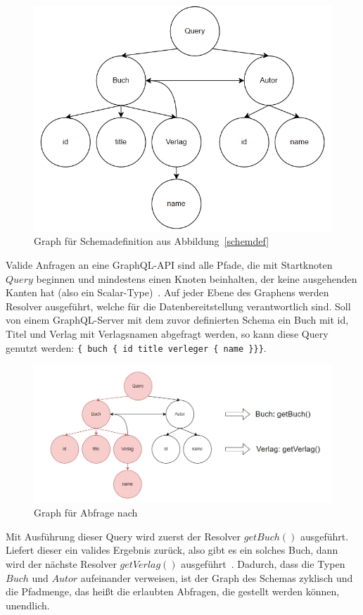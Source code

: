 \begin{figure}[htb]
    \centering
    \includegraphics[width=\textwidth,height=0.4\textheight,keepaspectratio]{img/graph}
    \caption{Graph für Schemadefinition aus Abbildung~\ref{schemdef}}
    \label{schemg}
\end{figure}

Valide Anfragen an eine GraphQL-API sind alle Pfade, die mit Startknoten $Query$ beginnen und mindestens einen Knoten beinhalten,
der keine ausgehenden Kanten hat (also ein Scalar-Type)~\cite[vgl. Modelling with GraphQL]{graphqlgraphtheory}.
Auf jeder Ebene des Graphens werden Resolver ausgeführt, welche für die Datenbereitstellung verantwortlich sind.
Soll von einem GraphQL-Server mit dem zuvor definierten Schema ein Buch mit id, Titel und Verlag mit Verlagsnamen abgefragt werden,
so kann diese Query genutzt werden: \verb+{ buch { id title verleger { name }}}+.

\begin{figure}[htb]
    \centering
    \includegraphics[width=\textwidth,height=0.4\textheight,keepaspectratio]{img/graphresolver}
    \caption{Graph für Abfrage nach~\cite{graphqlgraphtheory}}
    \label{abfrage}
\end{figure}

Mit Ausführung dieser Query wird zuerst der Resolver $getBuch()$ ausgeführt.
Liefert dieser ein valides Ergebnis zurück, also gibt es ein solches Buch, dann wird der nächste Resolver $getVerlag()$ ausgeführt~\cite[vgl. Resolver]{graphqlgraphtheory}.
Dadurch, dass die Typen $Buch$ und $Autor$ aufeinander verweisen, ist der Graph des Schemas zyklisch und die Pfadmenge,
das heißt die erlaubten Abfragen, die gestellt werden können, unendlich.
